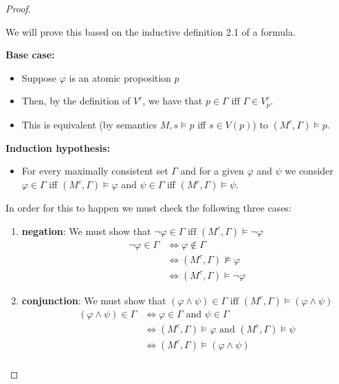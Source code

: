 \documentclass[12pt]{article}
\numberwithin{equation}{section}
\theoremstyle{definition}
\theoremstyle{definition}
\theoremstyle{remark}
\begin{document}
\begin{proof}
~

We will prove this based on the inductive definition 2.1 of a formula.

\textbf{Base case:} 
\begin{itemize}
    \item Suppose $\varphi$ is an atomic proposition $p$
    \item Then, by the definition of $V^c$, we have that $p \in\Gamma \text{ iff } \Gamma \in V^c_p$.
    \item This is equivalent (by semantics $M,s \models p$ iff $s \in V (p)$) to $(M^c , \Gamma)\models p$.
\end{itemize}


\textbf{Induction hypothesis:}
\begin{itemize}
    \item For every maximally consistent set $\Gamma $ and for a given $\varphi$ and $\psi$ we consider $\varphi \in \Gamma$ iff $(M^c, \Gamma) \models \varphi$ and $\psi \in \Gamma$ iff $(M^c, \Gamma) \models \psi$.
\end{itemize}


In order for this to happen we must check the following three cases:

\begin{enumerate}
    \item \textbf{negation}: We must show that $\neg\varphi \in \Gamma \text{ iff } ( M^c, \Gamma ) \models \neg\varphi$
   \begin{align*}
    \neg\varphi \in \Gamma &\Leftrightarrow  \varphi \notin \Gamma
    \tag{by item 2 of lemma 3.6} \\
    &\Leftrightarrow  (M^c, \Gamma) \not\models \varphi
    \tag{by the induction hypothesis} \\
    &\Leftrightarrow (M^c, \Gamma) \models \neg\varphi
    \tag{by the semantics}
\end{align*}
    
    \item \textbf{conjunction}: We must show that $(\varphi \land \psi) \in \Gamma \text{ iff } ( M^c, \Gamma ) \models (\varphi \land \psi)$
    \begin{align*}
        (\varphi \land \psi) \in \Gamma &\Leftrightarrow \varphi \in \Gamma \text{ and } \psi \in \Gamma \tag{by item 3 of lemma 3.6}\\
        &\Leftrightarrow (M^c, \Gamma) \models \varphi \text{ and }  (M^c, \Gamma) \models \psi \tag{induction hypothesis}\\
        &\Leftrightarrow (M^c, \Gamma) \models (\varphi \land\psi) \tag{by semantics}\\
    \end{align*}
    

\end{enumerate}
\end{proof}
\end{document}
